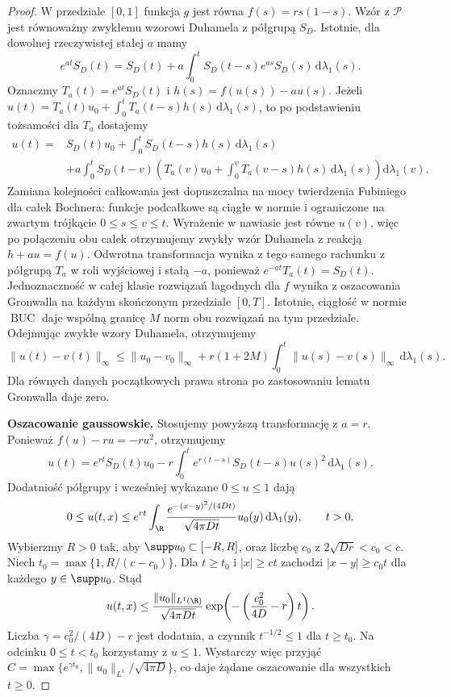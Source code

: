 \begin{proof}
W przedziale $[0,1]$ funkcja $g$ jest równa
$f(s)=rs(1-s)$. Wzór z $\mathcal P$ jest równoważny
zwykłemu wzorowi Duhamela z półgrupą $S_D$.
Istotnie, dla dowolnej rzeczywistej stałej $a$
mamy
\[
 e^{at}S_D(t)=S_D(t)+a\int_0^t
 S_D(t-s)e^{as}S_D(s)\,\mathrm d\lambda_1(s).
\]
Oznaczmy $T_a(t)=e^{at}S_D(t)$ i
$h(s)=f(u(s))-au(s)$. Jeżeli
$u(t)=T_a(t)u_0+\int_0^t T_a(t-s)h(s)\,
\mathrm d\lambda_1(s)$, to po podstawieniu
tożsamości dla $T_a$ dostajemy
\[
 \begin{aligned}
 u(t)={}&S_D(t)u_0+
   \int_0^t S_D(t-s)h(s)\,\mathrm d\lambda_1(s)\\
 &+a\int_0^t S_D(t-v)
   \left(T_a(v)u_0+
     \int_0^v T_a(v-s)h(s)\,\mathrm d\lambda_1(s)\right)
     \mathrm d\lambda_1(v).
 \end{aligned}
\]
Zamiana kolejności całkowania jest dopuszczalna
na mocy twierdzenia Fubiniego dla całek Bochnera:
funkcje podcałkowe są ciągłe w normie i ograniczone
na zwartym trójkącie $0\le s\le v\le t$.
Wyrażenie w nawiasie jest równe $u(v)$, więc
po połączeniu obu całek otrzymujemy zwykły wzór
Duhamela z reakcją $h+au=f(u)$.
Odwrotna transformacja wynika z tego samego
rachunku z półgrupą $T_a$ w roli wyjściowej
i stałą $-a$, ponieważ $e^{-at}T_a(t)=S_D(t)$.
Jednoznaczność w całej klasie rozwiązań łagodnych
dla $f$ wynika z oszacowania Gronwalla na każdym
skończonym przedziale $[0,T]$. Istotnie, ciągłość
w normie $\operatorname{BUC}$ daje wspólną granicę
$M$ norm obu rozwiązań na tym przedziale.
Odejmując zwykłe wzory Duhamela, otrzymujemy
\[
 \|u(t)-v(t)\|_\infty\le\|u_0-v_0\|_\infty+
 r(1+2M)\int_0^t\|u(s)-v(s)\|_\infty\,
 \mathrm d\lambda_1(s).
\]
Dla równych danych początkowych prawa strona
po zastosowaniu lematu Gronwalla daje zero.

\textbf{Oszacowanie gaussowskie.}
Stosujemy powyższą transformację z $a=r$.
Ponieważ $f(u)-ru=-ru^2$, otrzymujemy
\[
 u(t)=e^{rt}S_D(t)u_0-
 r\int_0^t e^{r(t-s)}S_D(t-s)u(s)^2\,
                       \mathrm d\lambda_1(s).
\]
Dodatniość półgrupy i wcześniej wykazane
$0\le u\le1$ dają
\[
 0\le u(t,x)\le e^{rt}\int_{\R}
 \frac{e^{-(x-y)^2/(4Dt)}}{\sqrt{4\pi Dt}}u_0(y)\,\mathrm d\lambda_1(y),
 \qquad t>0.
\]
Wybierzmy $R>0$ tak, aby $\supp u_0\subset[-R,R]$,
oraz liczbę $c_0$ z $2\sqrt{Dr}<c_0<c$.
Niech $t_0=\max\{1,R/(c-c_0)\}$. Dla $t\ge t_0$
i $|x|\ge ct$ zachodzi $|x-y|\ge c_0t$
dla każdego $y\in\supp u_0$. Stąd
\[
 u(t,x)\le\frac{\|u_0\|_{L^1(\R)}}{\sqrt{4\pi Dt}}
 \exp\!\left(-\left(\frac{c_0^2}{4D}-r\right)t\right).
\]
Liczba $\gamma=c_0^2/(4D)-r$ jest dodatnia,
a czynnik $t^{-1/2}\le1$ dla $t\ge t_0$.
Na odcinku $0\le t<t_0$ korzystamy z $u\le1$.
Wystarczy więc przyjąć
$C=\max\{e^{\gamma t_0},\|u_0\|_{L^1}/\sqrt{4\pi D}\}$,
co daje żądane oszacowanie dla wszystkich $t\ge0$.
\end{proof}

